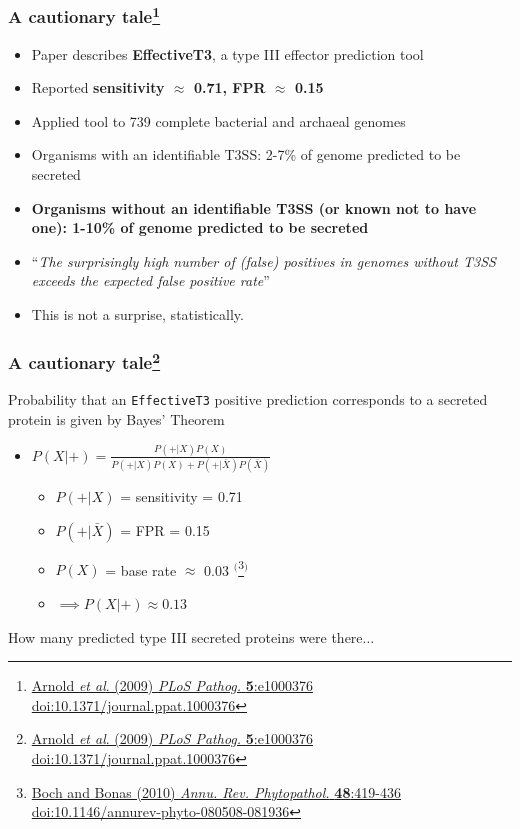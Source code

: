 \begin{frame}
  \frametitle{A cautionary tale\footnote{\tiny{\href{http://dx.doi.org/10.1371/journal.ppat.1000376}{Arnold \textit{et al}. (2009) \textit{PLoS Pathog.} \textbf{5}:e1000376 doi:10.1371/journal.ppat.1000376}}}}
  \begin{itemize}
    \item<1-> Paper describes \textbf{EffectiveT3}, a type III effector prediction tool
    \item<1-> Reported \textbf{sensitivity $\approx$ 0.71, FPR $\approx$ 0.15}
    \item<1-> Applied tool to 739 complete bacterial and archaeal genomes
    \item<2-> Organisms with an identifiable T3SS: 2-7\% of genome predicted to be secreted
    \item<2-> \textbf{Organisms without an identifiable T3SS (or known not to have one): 1-10\% of genome predicted to be secreted}
    \item<2-> ``\textit{The surprisingly high number of (false) positives in genomes without T3SS exceeds the expected false positive rate}''
    \item<2-> This is not a surprise, statistically.
  \end{itemize} 
\end{frame}

\begin{frame}
  \frametitle{A cautionary tale\footnote{\tiny{\href{http://dx.doi.org/10.1371/journal.ppat.1000376}{Arnold \textit{et al}. (2009) \textit{PLoS Pathog.} \textbf{5}:e1000376 doi:10.1371/journal.ppat.1000376}}}}
    Probability that an \texttt{EffectiveT3} positive prediction corresponds to a secreted protein is given by Bayes' Theorem \\[0.2cm]
    \begin{itemize}
      \item $P(X|+) =  \frac{P(+|X) P(X)}{P(+|X) P(X) + P(+|\bar{X}) P(\bar{X})}$
      \begin{itemize}
        \item $P(+|X)$ = sensitivity = 0.71
        \item $P(+|\bar{X})$ = FPR = 0.15
        \item $P(X)$ = base rate $\approx$ 0.03 $^($\footnote{\tiny{\href{http://dx.doi.org/10.1146/annurev-phyto-080508-081936}{Boch and Bonas (2010) \textit{Annu. Rev. Phytopathol.} \textbf{48}:419-436 doi:10.1146/annurev-phyto-080508-081936}}}$^)$
        \item $\implies P(X|+) \approx 0.13$
      \end{itemize}
    \end{itemize}
  How many predicted type III secreted proteins were there$\ldots$
\end{frame}

